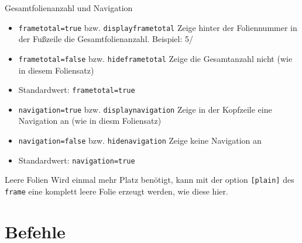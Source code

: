 \documentclass[german,10pt,xcolor=colortbl,compress
]{beamer}
\begin{document}
	\begin{frame}{Gesamtfolienanzahl und Navigation}
		\begin{itemize}
			\item \lstinline|frametotal=true| bzw. \lstinline|displayframetotal| Zeige hinter der Foliennummer in der Fußzeile die Gesamtfolienanzahl. Beispiel: 5/\inserttotalframenumber
			\item \lstinline|frametotal=false| bzw. \lstinline|hideframetotal| Zeige die Gesamtanzahl nicht (wie in diesem Foliensatz)
			\item Standardwert: \lstinline|frametotal=true|
		\end{itemize}
		\vspace{\baselineskip}
		\begin{itemize}
			\item \lstinline|navigation=true| bzw. \lstinline|displaynavigation| Zeige in der Kopfzeile eine Navigation an (wie in diesm Foliensatz)
			\item \lstinline|navigation=false| bzw. \lstinline|hidenavigation| Zeige keine Navigation an
			\item Standardwert: \lstinline|navigation=true|
		\end{itemize}
	\end{frame}
	\begin{frame}[plain]{Leere Folien}
		Wird einmal mehr Platz benötigt, kann mit der option \lstinline|[plain]| des \lstinline|frame| eine komplett leere Folie erzeugt werden, wie diese hier.
	\end{frame}
	\section{Befehle}
\end{document}
